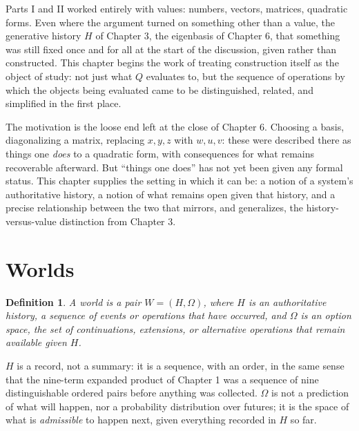 \documentclass[11pt]{book}
\newtheorem{definition}[theorem]{Definition}
\begin{document}
Parts I and II worked entirely with values: numbers, vectors, matrices, quadratic forms. Even where the argument turned on something other than a value, the generative history $H$ of Chapter 3, the eigenbasis of Chapter 6, that something was still fixed once and for all at the start of the discussion, given rather than constructed. This chapter begins the work of treating construction itself as the object of study: not just what $Q$ evaluates to, but the sequence of operations by which the objects being evaluated came to be distinguished, related, and simplified in the first place.

The motivation is the loose end left at the close of Chapter 6. Choosing a basis, diagonalizing a matrix, replacing $x,y,z$ with $w,u,v$: these were described there as things one \emph{does} to a quadratic form, with consequences for what remains recoverable afterward. But ``things one does'' has not yet been given any formal status. This chapter supplies the setting in which it can be: a notion of a system's authoritative history, a notion of what remains open given that history, and a precise relationship between the two that mirrors, and generalizes, the history-versus-value distinction from Chapter 3.

\section{Worlds}

\begin{definition}
A \emph{world} is a pair $W=(H,\Omega)$, where $H$ is an \emph{authoritative history}, a sequence of events or operations that have occurred, and $\Omega$ is an \emph{option space}, the set of continuations, extensions, or alternative operations that remain available given $H$.
\end{definition}

$H$ is a record, not a summary: it is a sequence, with an order, in the same sense that the nine-term expanded product of Chapter 1 was a sequence of nine distinguishable ordered pairs before anything was collected. $\Omega$ is not a prediction of what will happen, nor a probability distribution over futures; it is the space of what is \emph{admissible} to happen next, given everything recorded in $H$ so far.
\end{document}
